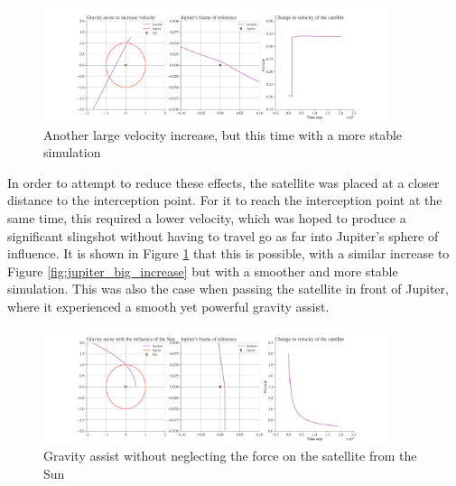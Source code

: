 \documentclass[11pt, english]{report}
\begin{document}
{\begin{figure}[ht]
    \centering
    \includegraphics[width=0.9\textwidth]{graphics/jupiter_reduced_vel.png}
    \caption{Another large velocity increase, but this time with a more stable simulation}
    \label{fig:jupiter_reduced_vel}
\end{figure}

In order to attempt to reduce these effects, the satellite was placed at a closer distance to the interception point. For it to reach the interception point at the same time, this required a lower velocity, which was hoped to produce a significant slingshot without having to travel go as far into Jupiter's sphere of influence. It is shown in Figure \ref{fig:jupiter_reduced_vel} that this is possible, with a similar increase to Figure \ref{fig:jupiter_big_increase} but with a smoother and more stable simulation. This was also the case when passing the satellite in front of Jupiter, where it experienced a smooth yet powerful gravity assist.

\begin{figure}[ht]
    \centering
    \includegraphics[width=0.9\textwidth]{graphics/circularmotion.png}
    \caption{Gravity assist without neglecting the force on the satellite from the Sun}
    \label{fig:circularmotion}
\end{figure}

}
\end{document}
